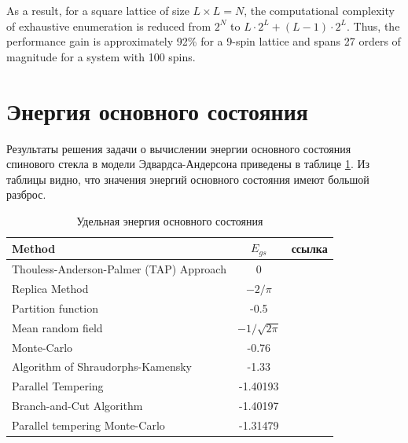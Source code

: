 \documentclass[utf8, babel, sor, jor, amsmath, amssymb, reprint]{elsarticle} %
\begin{document}
As a result, for a square lattice of size $L \times L = N$, the computational complexity of exhaustive enumeration is reduced from $2^{N}$ to $L \cdot 2^L + (L - 1) \cdot 2^L$. Thus, the performance gain is approximately 92\% for a 9-spin lattice and spans 27 orders of magnitude for a system with 100 spins.


\section{Энергия основного состояния}

Результаты решения задачи о вычислении энергии основного состояния спинового стекла в модели Эдвардса-Андерсона приведены в таблице \ref{tab:Egs}. Из таблицы видно, что значения энергий основного состояния  имеют большой разброс.

\begin{table}[h]
	\begin{tabular}{|l|c|l|}
		\hline
		Method                                   & $E_{gs}$                                       & ссылка                                          \\ \hline
		Thouless-Anderson-Palmer (TAP) Approach & 0                                              & \cite{thouless1977solution}    \\ \hline
		Replica Method                            & $-2/\pi$                                       & \cite{sherrington1975solvable} \\ \hline
		Partition function                      & -0.5                                           & \cite{tanaka1980analytic}      \\ \hline
		Mean random field                       & $-1/\sqrt{2\pi}$                               & \cite{klein1976comparison}     \\ \hline
		Monte-Carlo                             & -0.76                                          & \cite{kirkpatrick1978infinite} \\ \hline
		Algorithm of Shraudorphs-Kamensky        & -1.33                                          & \cite{karandashev2019global}   \\ \hline
		Parallel Tempering   & -1.40193                                       & \cite{palmer1999ground}        \\ \hline
		Branch-and-Cut Algorithm              & -1.40197                         
		& \cite{campbell2004energy}      \\ \hline
		
		Parallel tempering Monte-Carlo  & -1.31479                                       & \cite{roma2009ground}          \\ \hline
		
		
		
	\end{tabular}
	\caption{Удельная энергия основного состояния}
	\label{tab:Egs}
\end{table}
\end{document}
